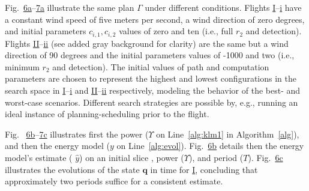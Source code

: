 \documentclass[letterpaper,10pt,journal,twoside]{IEEEtran}
\theoremstyle{definition}
\begin{document}

Fig.~{\color{blue}\hyperref[fig:stat]{6a}--\hyperref[fig:dyn]{7a}} 
illustrate the same plan $\Gamma$ under different conditions. Flights \hyperref[fig:trajs-I-static]{I}--\hyperref[fig:trajs-dyn-i]{i} have a constant wind speed of five meters per second, a wind direction of zero degrees, and initial parameters $c_{i,1},c_{i,2}$ values of zero and ten (i.e., full $r_2$ and detection). Flights \hyperref[fig:trajs-II-static]{II}--\hyperref[fig:trajs-dyn-ii]{ii} (see added gray background for clarity) are the same but a wind direction of 90 degrees and the initial parameters values of -1000 and two (i.e., minimum $r_2$ and detection). 
{\color{blue} The initial values of path and computation parameters are chosen to represent the highest and lowest configurations in the search space in \hyperref[fig:trajs-I-static]{I}--\hyperref[fig:trajs-dyn-i]{i} and \hyperref[fig:trajs-II-static]{II}--\hyperref[fig:trajs-dyn-ii]{ii} respectively, modeling the behavior of the best- and worst-case scenarios.
Different search strategies are possible by, e.g., running an ideal instance of planning-scheduling prior to the flight.}

Fig.~%
{\color{blue}\hyperref[fig:stat]{6b}--\hyperref[fig:dyn]{7c}} %
illustrates first the power ($\Upsilon$ on Line~\ref{alg:klm1} in Algorithm~\ref{alg}), and then the energy model ($y$ on Line~\ref{alg:evol}).
{\color{blue} Fig.~\hyperref[fig:stat]{6b}} %
details then the energy model's estimate (%
{\color{blue}${\hat{y}}$}) on an initial slice%
, power ($\Upsilon$), and period ($T$).
{\color{blue} Fig.~\hyperref[fig:stat]{6c}} illustrates the evolutions of the state $\mathbf{q}$ in time {\color{blue}for \hyperref[fig:ener:static-I]{I}}, concluding that approximately two periods suffice for a consistent %
estimate. 
\end{document}
